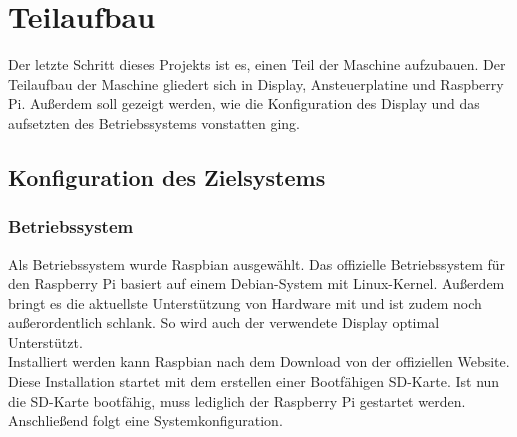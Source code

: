 \section{Teilaufbau}
Der letzte Schritt dieses Projekts ist es, einen Teil der Maschine aufzubauen.
Der Teilaufbau der Maschine gliedert sich in Display, Ansteuerplatine und Raspberry Pi.
Außerdem soll gezeigt werden, wie die Konfiguration des Display und das aufsetzten des Betriebssystems vonstatten ging.
\subsection{Konfiguration des Zielsystems}
\subsubsection{Betriebssystem}
Als Betriebssystem wurde Raspbian ausgewählt.
Das offizielle Betriebssystem für den Raspberry Pi basiert auf einem Debian-System mit Linux-Kernel.
Außerdem bringt es die aktuellste Unterstützung von Hardware mit und ist zudem noch außerordentlich schlank.
So wird auch der verwendete Display optimal Unterstützt.\\
Installiert werden kann Raspbian nach dem Download von der offiziellen Website.
Diese Installation startet mit dem erstellen einer Bootfähigen SD-Karte.
Ist nun die SD-Karte bootfähig, muss lediglich der Raspberry Pi gestartet werden.
Anschließend folgt eine Systemkonfiguration.
